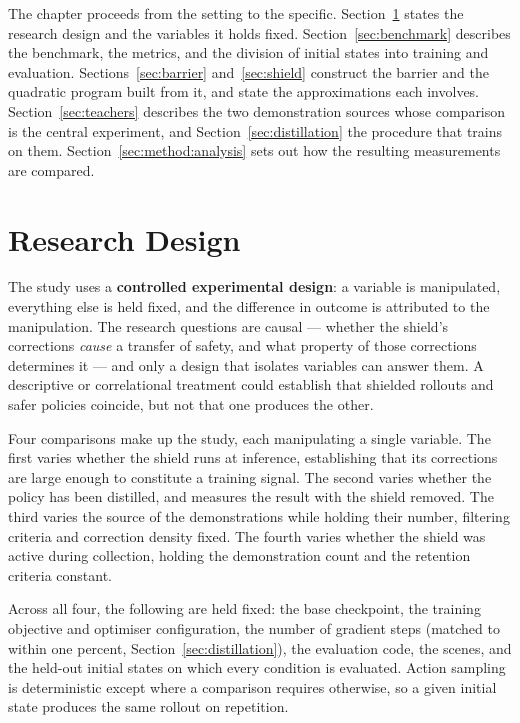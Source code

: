 \documentclass[a4paper,11pt]{report}
\begin{document}
The chapter proceeds from the setting to the specific. Section~\ref{sec:method:design} states the
research design and the variables it holds fixed. Section~\ref{sec:benchmark} describes the
benchmark, the metrics, and the division of initial states into training and evaluation.
Sections~\ref{sec:barrier} and~\ref{sec:shield} construct the barrier and the quadratic program
built from it, and state the approximations each involves.
Section~\ref{sec:teachers} describes the two demonstration sources whose comparison is the central
experiment, and Section~\ref{sec:distillation} the procedure that trains on them.
Section~\ref{sec:method:analysis} sets out how the resulting measurements are compared.

\section{Research Design}\label{sec:method:design}

The study uses a \textbf{controlled experimental design}: a variable is manipulated, everything
else is held fixed, and the difference in outcome is attributed to the manipulation. The research
questions are causal --- whether the shield's corrections \emph{cause} a transfer of safety, and
what property of those corrections determines it --- and only a design that isolates variables can
answer them. A descriptive or correlational treatment could establish that shielded rollouts and
safer policies coincide, but not that one produces the other.

Four comparisons make up the study, each manipulating a single variable. The first varies whether
the shield runs at inference, establishing that its corrections are large enough to constitute a
training signal. The second varies whether the policy has been distilled, and measures the result
with the shield removed. The third varies the source of the demonstrations while holding their
number, filtering criteria and correction density fixed. The fourth varies whether the shield was
active during collection, holding the demonstration count and the retention criteria constant.

Across all four, the following are held fixed: the base checkpoint, the training objective and
optimiser configuration, the number of gradient steps (matched to within one percent,
Section~\ref{sec:distillation}), the evaluation code, the scenes, and the held-out initial states
on which every condition is evaluated. Action sampling is deterministic except where a comparison
requires otherwise, so a given initial state produces the same rollout on repetition.
\end{document}
